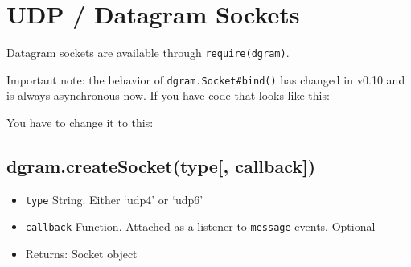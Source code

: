 \section{UDP / Datagram Sockets}\label{udp-datagram-sockets}

\begin{Shaded}
\begin{Highlighting}[]
 
\end{Highlighting}
\end{Shaded}

Datagram sockets are available through
\texttt{require(\textquotesingle{}dgram\textquotesingle{})}.

Important note: the behavior of \texttt{dgram.Socket\#bind()} has
changed in v0.10 and is always asynchronous now. If you have code that
looks like this:

\begin{Shaded}
\begin{Highlighting}[]
 \NormalTok{(}\NormalTok{);}
\NormalTok{(}\NormalTok{);}
\NormalTok{(}\NormalTok{);}
\end{Highlighting}
\end{Shaded}

You have to change it to this:

\begin{Shaded}
\begin{Highlighting}[]
 \NormalTok{(}\NormalTok{);}
\NormalTok{(}\NormalTok{, }\NormalTok{() \{}
  \NormalTok{(}\NormalTok{);}
\NormalTok{\});}
\end{Highlighting}
\end{Shaded}

\subsection{dgram.createSocket(type{[},
callback{]})}\label{dgram.createsockettype-callback}

\begin{itemize}
\itemsep1pt\parskip0pt
\item
  \texttt{type} String. Either `udp4' or `udp6'
\item
  \texttt{callback} Function. Attached as a listener to \texttt{message}
  events. Optional
\item
  Returns: Socket object
\end{itemize}

